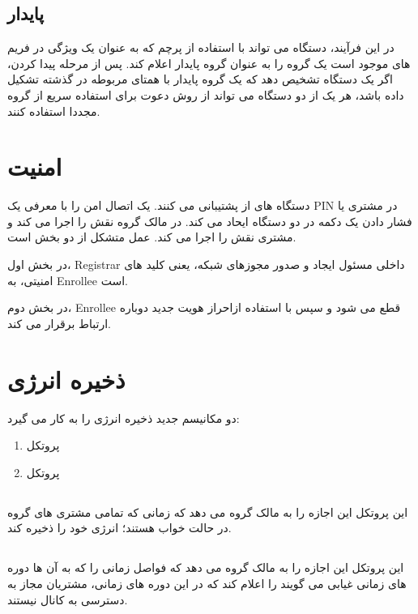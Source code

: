 \subsection{پایدار}
در این فرآیند، دستگاه می تواند با استفاده از پرچم 
که به عنوان یک ویژگی در فریم های 
موجود است یک گروه را به عنوان گروه پایدار اعلام کند.
پس از مرحله پیدا کردن، اگر یک دستگاه تشخیص دهد که یک گروه پایدار با همتای مربوطه در گذشته تشکیل داده باشد، هر یک از دو دستگاه می تواند از روش دعوت
 برای استفاده سریع از گروه مجددا استفاده کنند.
\section{امنیت}
دستگاه های
از 
 
پشتیبانی می کنند.
یک اتصال امن را با معرفی یک PIN در مشتری یا فشار دادن یک دکمه در دو دستگاه 
 ایحاد می کند.
 در 
مالک گروه نقش 
 را اجرا می کند و مشتری نقش 
 را اجرا می کند. عمل
  متشکل از دو بخش است. 
  
  در بخش اول، Registrar داخلی مسئول ایجاد و صدور مجوزهای شبکه، یعنی کلید های امنیتی، به Enrollee است. 
  
  در بخش دوم، Enrollee قطع می شود و سپس با استفاده ازاحراز هویت 
  جدید دوباره ارتباط  برقرار می کند.

\section{ذخیره انرژی}
دو مکانیسم جدید ذخیره انرژی را به کار می گیرد:
\begin{enumerate}
	\item پروتکل 
	\item پروتکل 
	
\end{enumerate}
\subsection{}
این پروتکل این اجازه را به مالک گروه می دهد که زمانی که تمامی مشتری های گروه در حالت خواب
هستند؛ انرژی خود را ذخیره کند.

\subsection{}
این پروتکل این اجازه را به مالک گروه می دهد که فواصل زمانی را که به آن ها دوره های زمانی غیابی می گویند را اعلام کند که در این دوره های زمانی، مشتریان مجاز به دسترسی به کانال نیستند.

